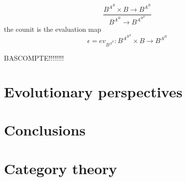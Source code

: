 \documentclass[aps,twocolumn]{revtex4-1}
\begin{document}
		$$
			\frac{B^{A^B} \times B \longrightarrow B^{A^B}}{B^{A^B} \longrightarrow B^{A^{B^B}}}
		$$
		the counit is the evaluation map
		$$
			\epsilon = ev_{B^{A^B}} \colon B^{A^{B^B}} \times B \longrightarrow B^{A^B}
		$$
	


BASCOMPTE!!!!!!!!

	
\section{Evolutionary perspectives}

\section{Conclusions}


 



\appendix

\section{Category theory}\label{app:CatTh}


%
\end{document}
